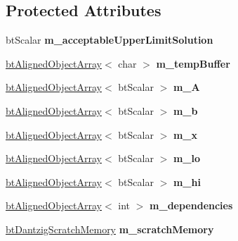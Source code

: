 \subsection*{Protected Attributes}
\begin{DoxyCompactItemize}
\item 
\hypertarget{classbt_dantzig_solver_aa6598890a5f1aa8661e986af9dc56ac7}{bt\+Scalar {\bfseries m\+\_\+acceptable\+Upper\+Limit\+Solution}}\label{classbt_dantzig_solver_aa6598890a5f1aa8661e986af9dc56ac7}

\item 
\hypertarget{classbt_dantzig_solver_ac973f8cced8007c9995ad6a7fc19756b}{\hyperlink{classbt_aligned_object_array}{bt\+Aligned\+Object\+Array}$<$ char $>$ {\bfseries m\+\_\+temp\+Buffer}}\label{classbt_dantzig_solver_ac973f8cced8007c9995ad6a7fc19756b}

\item 
\hypertarget{classbt_dantzig_solver_aa4877b3ae77406e7140f65fe0010d128}{\hyperlink{classbt_aligned_object_array}{bt\+Aligned\+Object\+Array}$<$ bt\+Scalar $>$ {\bfseries m\+\_\+\+A}}\label{classbt_dantzig_solver_aa4877b3ae77406e7140f65fe0010d128}

\item 
\hypertarget{classbt_dantzig_solver_a80332e7453a22a112ce34fb1d498d4c7}{\hyperlink{classbt_aligned_object_array}{bt\+Aligned\+Object\+Array}$<$ bt\+Scalar $>$ {\bfseries m\+\_\+b}}\label{classbt_dantzig_solver_a80332e7453a22a112ce34fb1d498d4c7}

\item 
\hypertarget{classbt_dantzig_solver_a7a7b363ade09bf0356d73863383aabbd}{\hyperlink{classbt_aligned_object_array}{bt\+Aligned\+Object\+Array}$<$ bt\+Scalar $>$ {\bfseries m\+\_\+x}}\label{classbt_dantzig_solver_a7a7b363ade09bf0356d73863383aabbd}

\item 
\hypertarget{classbt_dantzig_solver_a5118e4d69a57fec9c5d337e7862b47a2}{\hyperlink{classbt_aligned_object_array}{bt\+Aligned\+Object\+Array}$<$ bt\+Scalar $>$ {\bfseries m\+\_\+lo}}\label{classbt_dantzig_solver_a5118e4d69a57fec9c5d337e7862b47a2}

\item 
\hypertarget{classbt_dantzig_solver_a296a35b703d100a863f99afa991ccb77}{\hyperlink{classbt_aligned_object_array}{bt\+Aligned\+Object\+Array}$<$ bt\+Scalar $>$ {\bfseries m\+\_\+hi}}\label{classbt_dantzig_solver_a296a35b703d100a863f99afa991ccb77}

\item 
\hypertarget{classbt_dantzig_solver_a680116d924b987d54a6272a0e506672f}{\hyperlink{classbt_aligned_object_array}{bt\+Aligned\+Object\+Array}$<$ int $>$ {\bfseries m\+\_\+dependencies}}\label{classbt_dantzig_solver_a680116d924b987d54a6272a0e506672f}

\item 
\hypertarget{classbt_dantzig_solver_a8a3d108d7d813d89976f41861de7f3e4}{\hyperlink{structbt_dantzig_scratch_memory}{bt\+Dantzig\+Scratch\+Memory} {\bfseries m\+\_\+scratch\+Memory}}\label{classbt_dantzig_solver_a8a3d108d7d813d89976f41861de7f3e4}

\end{DoxyCompactItemize}


